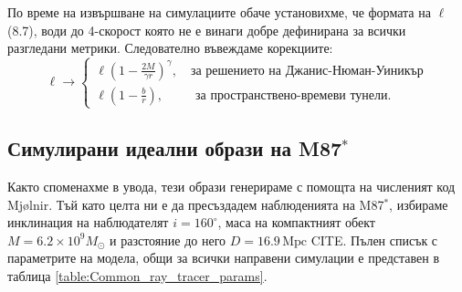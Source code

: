 По време на извършване на симулациите обаче установихме, че формата на $\ell$ (8.7), води до 4-скорост която не е винаги добре дефинирана за всички разгледани метрики. Следователно въвеждаме корекциите:
\begin{equation}
	\ell\rightarrow\begin{cases}
		\ell \left(1 - \frac{2M}{\gamma r}\right)^{\gamma}, \quad\text{за решението на Джанис-Нюман-Уиникър}\\
		\ell \left(1 - \frac{b}{r}\right), \,\,\,\qquad\text{за пространствено-времеви тунели}.
	\end{cases}
\end{equation}
\subsection{Симулирани идеални образи на M87$^*$}

Както споменахме в увода, тези образи генерираме с помощта на численият код Mjølnir. Тъй като целта ни е да пресъздадем наблюденията на M87$^*$, избираме инклинация на наблюдателят $i = 160^\circ$, маса на компактният обект $M = 6.2\times 10^9M_\odot$ и разстояние до него $D = 16.9\, \text{Mpc}$ CITE. Пълен списък с параметрите на модела, общи за всички направени симулации е представен в таблица \ref{table:Common_ray_tracer_params}.\\

